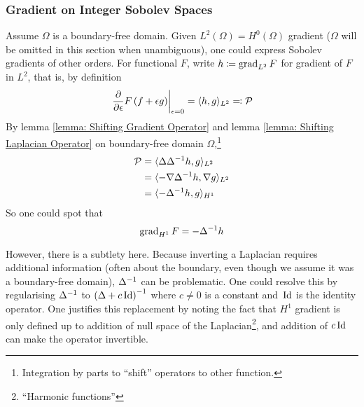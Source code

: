\documentclass[../dissertation.tex]{subfiles}
\begin{document}
\subsubsection{Gradient on Integer Sobolev Spaces}
\label{sct: Gradient on Integer Sobolev Spaces}
Assume $\Omega$ is a boundary-free domain.
Given $L^2(\Omega) = H^0(\Omega)$ gradient ($\Omega$ will be omitted in this section when unambiguous), one could express Sobolev gradients of other orders.
For functional $F$, write $h \coloneqq \operatorname{grad}_{L^2} F$ for gradient of $F$ in $L^2$, that is, by definition
\begin{equation}
    \left.\frac{\partial}{\partial \epsilon} F \left( f + \epsilon g \right)\right|_{\epsilon = 0} = \langle h, g \rangle_{L^2} \eqqcolon \mathcal{P}
    \label{equ: L2 Gradient Explicit Form}
\end{equation}
By lemma \ref{lemma: Shifting Gradient Operator} and lemma \ref{lemma: Shifting Laplacian Operator} on boundary-free domain $\Omega$,\footnote{Integration by parts to ``shift'' operators to other function.}
\begin{align*}
    \mathcal{P} &= \langle \Delta \Delta^{-1} h, g \rangle_{L^2} \\
    &= \langle -\nabla \Delta^{-1} h, \nabla g \rangle_{L^2} \\
    &= \langle -\Delta^{-1} h, g \rangle_{H^1}
\end{align*}
So one could spot that
\begin{equation}
    \operatorname{grad}_{H^1} F = -\Delta^{-1} h
    \label{equ: H1 Gradient}
\end{equation}
\begin{remark}
However, there is a subtlety here.
Because inverting a Laplacian requires additional information
(often about the boundary, even though we assume it was a boundary-free domain),
$\Delta^{-1}$ can be problematic.
One could resolve this by regularising $\Delta^{-1}$ to $\left(\Delta + c \, \text{Id}\right)^{-1}$
where $c\neq 0$ is a constant and $\, \text{Id}$ is the identity operator.
One justifies this replacement by noting the fact that $H^1$ gradient is only defined up to
addition of null space of the Laplacian\footnote{``Harmonic functions''}, and addition of $c \, \text{Id}$ can make the operator invertible.
\end{remark}
\end{document}
